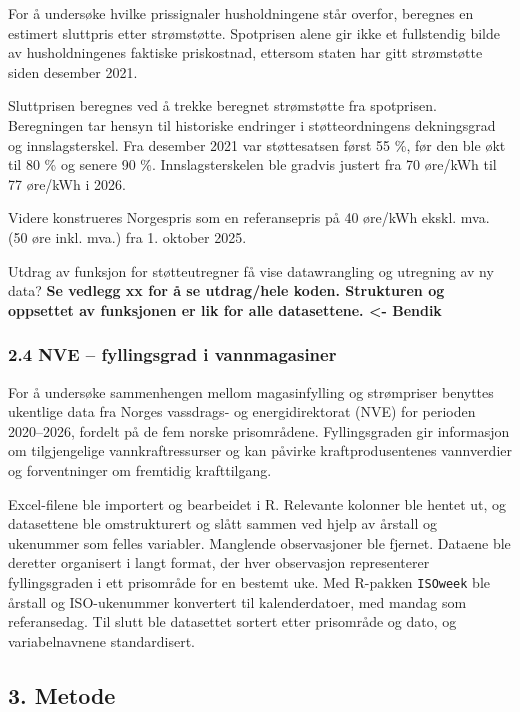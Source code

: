 \documentclass[
  letterpaper,
  DIV=11,
  numbers=noendperiod]{scrartcl}
\begin{document}
For å undersøke hvilke prissignaler husholdningene står overfor,
beregnes en estimert sluttpris etter strømstøtte. Spotprisen alene gir
ikke et fullstendig bilde av husholdningenes faktiske priskostnad,
ettersom staten har gitt strømstøtte siden desember 2021.

Sluttprisen beregnes ved å trekke beregnet strømstøtte fra spotprisen.
Beregningen tar hensyn til historiske endringer i støtteordningens
dekningsgrad og innslagsterskel. Fra desember 2021 var støttesatsen
først 55 \%, før den ble økt til 80 \% og senere 90 \%.
Innslagsterskelen ble gradvis justert fra 70 øre/kWh til 77 øre/kWh i
2026.

Videre konstrueres Norgespris som en referansepris på 40 øre/kWh ekskl.
mva. (50 øre inkl. mva.) fra 1. oktober 2025.

Utdrag av funksjon for støtteutregner få vise datawrangling og utregning
av ny data? \textbf{Se vedlegg xx for å se utdrag/hele koden. Strukturen
og oppsettet av funksjonen er lik for alle datasettene. \textless-
Bendik}

\subsubsection{2.4 NVE -- fyllingsgrad i
vannmagasiner}\label{nve-fyllingsgrad-i-vannmagasiner}

For å undersøke sammenhengen mellom magasinfylling og strømpriser
benyttes ukentlige data fra Norges vassdrags- og energidirektorat (NVE)
for perioden 2020--2026, fordelt på de fem norske prisområdene.
Fyllingsgraden gir informasjon om tilgjengelige vannkraftressurser og
kan påvirke kraftprodusentenes vannverdier og forventninger om fremtidig
krafttilgang.

Excel-filene ble importert og bearbeidet i R. Relevante kolonner ble
hentet ut, og datasettene ble omstrukturert og slått sammen ved hjelp av
årstall og ukenummer som felles variabler. Manglende observasjoner ble
fjernet. Dataene ble deretter organisert i langt format, der hver
observasjon representerer fyllingsgraden i ett prisområde for en bestemt
uke. Med R-pakken \texttt{ISOweek} ble årstall og ISO-ukenummer
konvertert til kalenderdatoer, med mandag som referansedag. Til slutt
ble datasettet sortert etter prisområde og dato, og variabelnavnene
standardisert.

\subsection{3. Metode}\label{metode}
\end{document}
